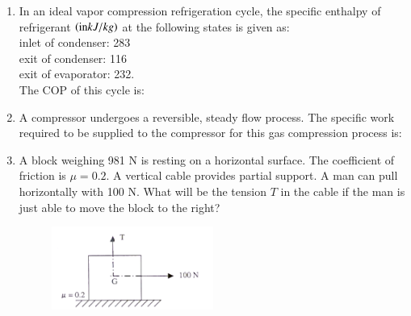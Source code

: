 \documentclass[journal]{IEEEtran}
\begin{document}
\begin{enumerate}[leftmargin=0pt]
\item In an ideal vapor compression refrigeration cycle, the specific enthalpy of refrigerant $\left(\text{in} kJ/kg\right)$ at the following states is given as: \\inlet of condenser: 283 \\exit of condenser: 116\\ exit of evaporator: 232.\\ The COP of this cycle is:
  \begin{enumerate}
  \end{enumerate}
  \hfill{}

\item A compressor undergoes a reversible, steady flow process. The specific work required to be supplied to the compressor for this gas compression process is:
  \begin{enumerate}
  \end{enumerate}
  \hfill{}


\item A block weighing 981 N is resting on a horizontal surface. The coefficient of friction is $\mu=0.2$. A vertical cable provides partial support. A man can pull horizontally with 100 N. What will be the tension $T$  in the cable if the man is just able to move the block to the right?

    \begin{figure}[h]
      \centering
      \includegraphics[width=0.5\textwidth]{Figs/image (2).png}
      \caption{}
      \label{fig:10}
    \end{figure}




\end{enumerate}
\end{document}
